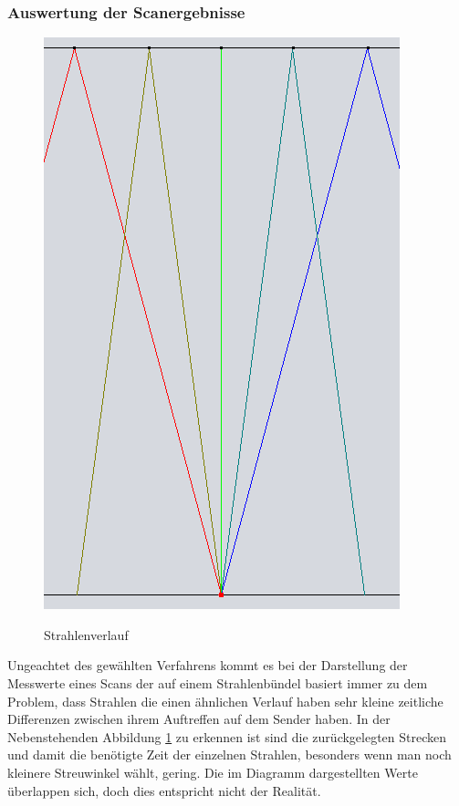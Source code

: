 \documentclass[reducespace,stylepage,semiarbeit]{spezidoc}
\begin{document}
\newpage
\subsubsection{Auswertung der Scanergebnisse}
\begin{figure}
\includegraphics[scale=0.25]{pictures/Strahlenbuendel.png}
\label{fig:Wegunterschied}
\caption{Strahlenverlauf}
\end{figure} 
Ungeachtet des gewählten Verfahrens kommt es bei der Darstellung der Messwerte eines Scans der auf einem Strahlenbündel basiert immer zu dem Problem, dass Strahlen die einen ähnlichen Verlauf haben sehr kleine zeitliche Differenzen zwischen ihrem Auftreffen auf dem Sender haben. 
In der Nebenstehenden Abbildung \ref{fig:Wegunterschied} zu erkennen ist sind die zurückgelegten Strecken und damit die benötigte Zeit der einzelnen Strahlen, besonders wenn man noch kleinere Streuwinkel wählt, gering. %
Die im Diagramm dargestellten Werte überlappen sich, doch dies entspricht nicht der Realität. 
\end{document}
